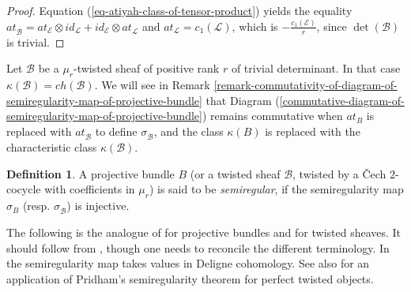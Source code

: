 \documentclass[12pt]{amsart}
\newcommand{\hide}[1]{}
\numberwithin{equation}{subsection}
\theoremstyle{plain}
\theoremstyle{definition}
\newtheorem{defi}[thm]{Definition}
\newcommand{\B}{{\mathcal B}}
\newcommand{\E}{{\mathcal E}}
\newcommand{\LB}{{\mathcal L}}
\newcommand{\PP}{{\mathbb P}}
\newcommand{\rank}{{\rm rank}}
\begin{document}
\begin{proof}
Equation (\ref{eq-atiyah-class-of-tensor-product}) yields the equality $at_\B^{}=at_\E\otimes id_\LB+id_\E\otimes at^{}_\LB$ and $at_\LB=c_1(\LB)$, which is $-\frac{c_1(\E)}{r}$, since $\det(\B)$ is trivial.
\hide{
Keep the notation $\iota:M_0\rightarrow M$ of Lemma \ref{lemma-atiyah-class-of-a-reflexive-twisted-sheaf}.
Then $\iota^*at^{}_\B=at_{\PP(\iota^*\E)}$, by Lemma \ref{lemma-atiyah-class-of-a-reflexive-twisted-sheaf} and \cite[page 189 property (2)]{atiyah}, and the latter is the traceless direct summand of $at_{\iota^*\E}=\iota^*at_\E$, by \cite[page 189 property (1)]{atiyah}. Equation
(\ref{eq-atiya-class-of-twisted-B-versus-that-of-E}) follows,
by the injectivity Lemma \ref{lemma-restriction-of-extension-classes-is-injective}
(keeping the convention of footnote \ref{footnote-atiyah-class}). 
}
\end{proof}

Let $\B$ be a $\mu_r$-twisted sheaf of positive rank $r$ of trivial determinant.
In that case $\kappa(\B)=ch(\B)$. 
We will see in 
Remark \ref{remark-commutativity-of-diagram-of-semiregularity-map-of-projective-bundle} that
Diagram (\ref{commutative-diagram-of-semiregularity-map-of-projective-bundle}) remains commutative when $at_B$ is replaced with $at^{}_\B$ to define $\sigma^{}_\B$,  and the class $\kappa(B)$ is replaced with the characteristic class $\kappa(\B)$. 

\begin{defi}
A projective bundle $B$ (or a twisted sheaf $\B$, twisted by a \v{C}ech $2$-cocycle with coefficients in $\mu_r$) 
is said to be {\em semiregular}, if the semiregularity map $\sigma_B$ (resp. $\sigma^{}_\B$) is injective.
\end{defi}

The following is the analogue of \cite[Th. 5.1]{buchweitz-flenner} for projective bundles and for twisted sheaves. It should follow from \cite[Remark 2.26]{pridham}, though one needs to reconcile the different terminology. In \cite{pridham} the semiregularity map takes values in Deligne cohomology. See also \cite[Theorem 14.4]{perry-hotchkiss} for an application of Pridham's semiregularity theorem for perfect twisted objects.
\end{document}
